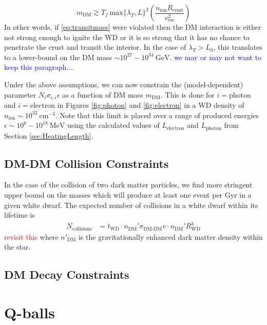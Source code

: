 \documentclass[twocolumn,showpacs,preprintnumbers,amsmath,amssymb,prd]{revtex4}
\newcommand{\GeV}{\text{GeV}}
\def\r{\right)}
\def\l{\left(}
\begin{document}
\begin{equation}
\label{eq:transitmass}
m_{\text{DM}} \gtrsim  T_f ~\text{max}\{\lambda_T, L\}^2 \l \frac{n_{\text{ion}} R_{\text{crust}}}{v_{\text{esc}}^2} \r
\end{equation}
In other words, if \eqref{eq:transitmass} were violated then the DM interaction is either not strong enough to ignite the WD or it is so strong that it has no chance to penetrate the crust and transit the interior. In the case of $\lambda_T > L_0$, this translates to a lower-bound on the DM mass $\sim 10^{27} - 10^{34} ~\GeV$. \textcolor{blue}{we may or may not want to keep this paragraph...}. 


Under the above assumptions, we can now constrain the (model-dependent) parameter $N_i \sigma_{i,\epsilon} \epsilon$ as a function of DM mass $m_\text{DM}$. This is done for $i=\text{photon}$ and $i = \text{electron}$ in Figures \ref{fig:photon} and \ref{fig:electron} in a WD density of $n_\text{ion} \sim 10^{32} ~\text{cm}^{-3}$. Note that this limit is placed over a range of produced energies $\epsilon \sim 10^{6} - 10^{18} ~\text{MeV}$ using the calculated values of $L_\text{electron}$ and $L_\text{photon}$ from Section \ref{sec:HeatingLength}. 


\subsection{DM-DM Collision Constraints}
\label{sec:CollisionConstraints}

In the case of the collision of two dark matter particles, we find more stringent upper bound on the masses which will produce at least one event per Gyr in a given white dwarf. The expected number of collisions in a white dwarf within its lifetime is
\begin{align}
N_\text{collisions}  &= t_\text{WD} \cdot n_\text{DM}' \sigma_\text{DM-DM} v \cdot n_\text{DM}'R_\text{WD}^3
\end{align}
\textcolor{red}{revisit this}
where $n'_\text{DM}$ is the gravitationally enhanced dark matter density within the star.


\subsection{DM Decay Constraints}
\label{sec:DecayConstraints}




\section{Q-balls}
\label{sec:ConcreteExamples}
\end{document}
